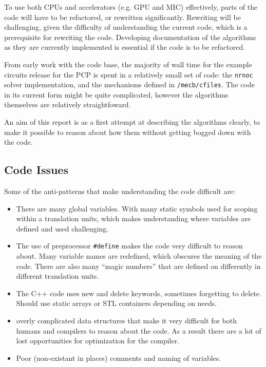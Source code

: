 \documentclass[11pt,a4paper]{article}
\newcommand{\lst}[1]{\lstinline!#1!}
\begin{document}
To use both CPUs and accelerators (e.g. GPU and MIC) effectively, parts of the code will have to be refactored, or rewritten significantly. Rewriting will be challenging, given the difficulty of understanding the current code, which is a prerequisite for rewriting the code. Developing documentation of the algorithms as they are currently implemented is essential if the code is to be refactored.

From early work with the code base, the majority of wall time for the example circuits release for the PCP is spent in a relatively small set of code: the \lst{nrnoc} solver implementation, and the mechanisms defined in \lst{/mecb/cfiles}. The code in its current form might be quite complicated, however the algorithms themselves are relatively straightfoward.

An aim of this report is as a first attempt at describing the algorithms clearly, to make it possible to reason about how them without getting bogged down with the code.

\subsection{Code Issues}
Some of the anti-patterns that make understanding the code difficult are:
\begin{itemize}
    \item
        There are many global variables. With many static symbols used for scoping within a translation units, which makes understanding where variables are defined and used challenging.
    \item
        The use of preprocessor \lst{#define} makes the code very difficult to reason about. Many variable names are redefined, which obscures the meaning of the code. There are also many ``magic numbers'' that are defined on differently in different translation units.
    \item
        The C++ code uses new and delete keywords, sometimes forgetting to delete. Should use static arrays or STL containers depending on needs.
    \item
        overly complicated data structures that make it very difficult for both humans and compilers to reason about the code. As a result there are a lot of lost opportunities for optimization for the compiler.
    \item
        Poor (non-existant in places) comments and naming of variables.
\end{itemize}
\end{document}
